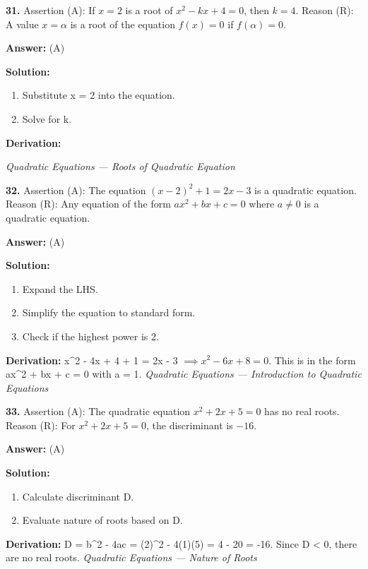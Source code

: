 \documentclass[12pt,a4paper]{exam}
\newcommand{\fitmath}[1]{%
  \sbox{\schmathbox}{$\displaystyle #1$}%
  \ifdim\wd\schmathbox>\linewidth
    \resizebox{\linewidth}{!}{\usebox{\schmathbox}}%
  \else
    \usebox{\schmathbox}%
  \fi}
\begin{document}
\begin{questions}
\question \textbf{31.} Assertion (A): If $x = 2$ is a root of $x^2 - kx + 4 = 0$, then $k = 4$. Reason (R): A value $x = \alpha$ is a root of the equation $f(x) = 0$ if $f(\alpha) = 0$.

\textbf{Answer:}
(A)

\textbf{Solution:}
\begin{enumerate}
  \item Substitute x = 2 into the equation.
  \item Solve for k.
\end{enumerate}
\textbf{Derivation:}
\begin{center}
\fitmath{\begin{aligned}
(2)^2 - k(2) + 4 = 0 \\
\implies 4 - 2k + 4 = 0 \\
\implies 8 = 2k \\
\implies k = 4.
\end{aligned}}
\end{center}
\hfill \textit{Quadratic Equations — Roots of Quadratic Equation}
\vspace{0.3cm}

\question \textbf{32.} Assertion (A): The equation $(x-2)^2 + 1 = 2x - 3$ is a quadratic equation. Reason (R): Any equation of the form $ax^2 + bx + c = 0$ where $a \neq 0$ is a quadratic equation.

\textbf{Answer:}
(A)

\textbf{Solution:}
\begin{enumerate}
  \item Expand the LHS.
  \item Simplify the equation to standard form.
  \item Check if the highest power is 2.
\end{enumerate}
\textbf{Derivation:}
x\textasciicircum{}2 - 4x + 4 + 1 = 2x - 3 $\implies x^2 - 6x + 8 = 0.$ This is in the form ax\textasciicircum{}2 + bx + c = 0 with a = 1.
\hfill \textit{Quadratic Equations — Introduction to Quadratic Equations}
\vspace{0.3cm}

\question \textbf{33.} Assertion (A): The quadratic equation $x^2 + 2x + 5 = 0$ has no real roots. Reason (R): For $x^2 + 2x + 5 = 0$, the discriminant is $-16$.

\textbf{Answer:}
(A)

\textbf{Solution:}
\begin{enumerate}
  \item Calculate discriminant D.
  \item Evaluate nature of roots based on D.
\end{enumerate}
\textbf{Derivation:}
D = b\textasciicircum{}2 - 4ac = (2)\textasciicircum{}2 - 4(1)(5) = 4 - 20 = -16. Since D < 0, there are no real roots.
\hfill \textit{Quadratic Equations — Nature of Roots}
\vspace{0.3cm}


\end{questions}
\end{document}

